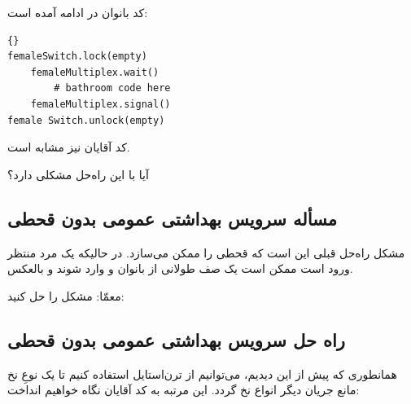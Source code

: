 \documentclass{book}
\newcommand{\clearemptydoublepage}{\newpage\cleardoublepage}
\begin{document}
    کد بانوان در ادامه آمده است: 

\begin{latin}
\begin{lstlisting}[title=\rl{راه حل سرویس بهداشتی عمومی (بانوان)}]{}
femaleSwitch.lock(empty)
    femaleMultiplex.wait()
        # bathroom code here
    femaleMultiplex.signal()
female Switch.unlock(empty)
\end{lstlisting}
\end{latin}

    کد آقایان نیز مشابه است. 

    آیا با این راه‌حل مشکلی دارد؟

\clearemptydoublepage
\subsection{مسأله سرویس بهداشتی عمومی بدون قحطی}

    مشکل راه‌حل قبلی این است که قحطی را ممکن می‌سازد. در حالیکه یک مرد منتظر ورود است  ممکن است یک صف طولانی از بانوان و وارد شوند و بالعکس. 

    معمّا: مشکل را حل کنید: 


\clearemptydoublepage
\subsection{راه حل سرویس بهداشتی عمومی بدون قحطی}

    همانطوری که پیش از این دیدیم، می‌توانیم از ترن‌استایل استفاده کنیم تا یک نوعِ نخ‌ مانع جریان دیگر انواع نخ گردد. این مرتبه به کد آقایان نگاه خواهیم انداخت: 
\end{document}
